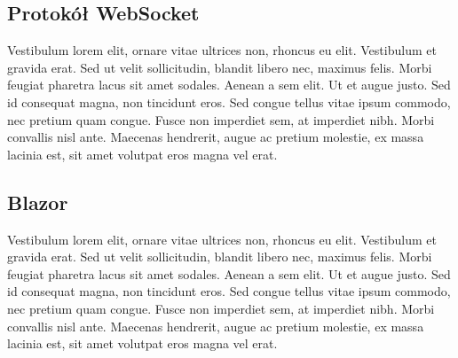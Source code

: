 \subsection{Protokół WebSocket}
Vestibulum lorem elit, ornare vitae ultrices non, rhoncus eu elit. Vestibulum et gravida erat. Sed ut velit sollicitudin, blandit libero nec, maximus felis. Morbi feugiat pharetra lacus sit amet sodales. Aenean a sem elit. Ut et augue justo. Sed id consequat magna, non tincidunt eros. Sed congue tellus vitae ipsum commodo, nec pretium quam congue. Fusce non imperdiet sem, at imperdiet nibh. Morbi convallis nisl ante. Maecenas hendrerit, augue ac pretium molestie, ex massa lacinia est, sit amet volutpat eros magna vel erat.

\subsection{Blazor}
Vestibulum lorem elit, ornare vitae ultrices non, rhoncus eu elit. Vestibulum et gravida erat. Sed ut velit sollicitudin, blandit libero nec, maximus felis. Morbi feugiat pharetra lacus sit amet sodales. Aenean a sem elit. Ut et augue justo. Sed id consequat magna, non tincidunt eros. Sed congue tellus vitae ipsum commodo, nec pretium quam congue. Fusce non imperdiet sem, at imperdiet nibh. Morbi convallis nisl ante. Maecenas hendrerit, augue ac pretium molestie, ex massa lacinia est, sit amet volutpat eros magna vel erat.